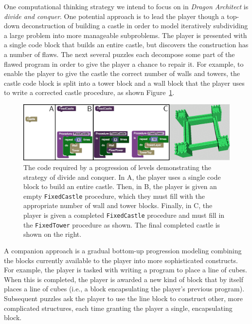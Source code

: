 \documentclass{sig-alternate}
\begin{document}
One computational thinking strategy we intend to focus on in \emph{Dragon Architect} is \emph{divide and conquer}.
One potential approach is to lead the player though a top-down deconstruction of building a castle in order to model iteratively subdividing a large problem into more manageable subproblems.
The player is presented with a single code block that builds an entire castle, but discovers the construction has a number of flaws. 
The next several puzzles each decompose some part of the flawed program in order to give the player a chance to repair it. 
For example, to enable the player to give the castle the correct number of walls and towers, the castle code block is split into a tower block and a wall block that the player uses to write a corrected castle procedure, as shown Figure~\ref{fig:decomp}. 

\begin{figure}[th!]
  \centering
  \includegraphics[width=\textwidth]{images/decomp-code}
  \caption{The code required by a progression of levels demonstrating the strategy of divide and conquer. In A, the player uses a single code block to build an entire castle. Then, in B, the player is given an empty \texttt{FixedCastle} procedure, which they must fill with the appropriate number of wall and tower blocks. Finally, in C, the player is given a completed \texttt{FixedCastle} procedure and must fill in the \texttt{FixedTower} procedure as shown. The final completed castle is shown on the right.}
  \label{fig:decomp}
\end{figure}

A companion approach is a gradual bottom-up progression modeling combining the blocks currently available to the player into more sophisticated constructs. 
For example, the player is tasked with writing a program to place a line of cubes. 
When this is completed, the player is awarded a new kind of block that by itself places a line of cubes (i.e., a block encapsulating the player's previous program). 
Subsequent puzzles ask the player to use the line block to construct other, more complicated structures, each time granting the player a single, encapsulating block.  
\end{document}
